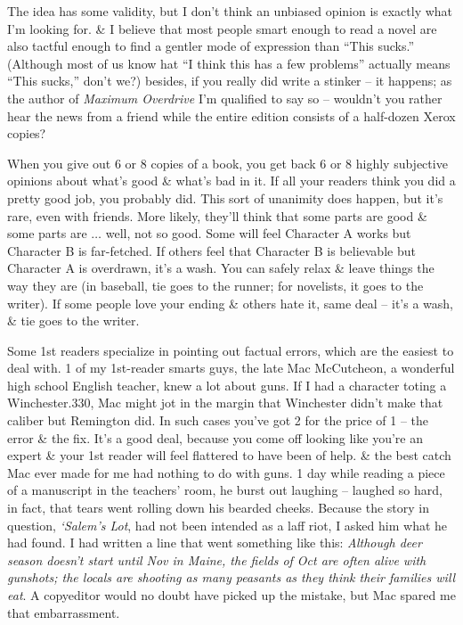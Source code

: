 \documentclass{article}
\numberwithin{equation}{section}
\begin{document}
The idea has some validity, but I don't think an unbiased opinion is exactly what I'm looking for. \& I believe that most people smart enough to read a novel are also tactful enough to find a gentler mode of expression than ``This sucks.'' (Although most of us know hat ``I think this has a few problems'' actually means ``This sucks,'' don't we?) besides, if you really did write a stinker -- it happens; as the author of \textit{Maximum Overdrive} I'm qualified to say so -- wouldn't you rather hear the news from a friend while the entire edition consists of a half-dozen Xerox copies?

When you give out 6 or 8 copies of a book, you get back 6 or 8 highly subjective opinions about what's good \& what's bad in it. If all your readers think you did a pretty good job, you probably did. This sort of unanimity does happen, but it's rare, even with friends. More likely, they'll think that some parts are good \& some parts are $\ldots$ well, not so good. Some will feel Character A works but Character B is far-fetched. If others feel that Character B is believable but Character A is overdrawn, it's a wash. You can safely relax \& leave things the way they are (in baseball, tie goes to the runner; for novelists, it goes to the writer). If some people love your ending \& others hate it, same deal -- it's a wash, \& tie goes to the writer.

Some 1st readers specialize in pointing out factual errors, which are the easiest to deal with. 1 of my 1st-reader smarts guys, the late Mac McCutcheon, a wonderful high school English teacher, knew a lot about guns. If I had a character toting a Winchester.330, Mac might jot in the margin that Winchester didn't make that caliber but Remington did. In such cases you've got 2 for the price of 1 -- the error \& the fix. It's a good deal, because you come off looking like you're an expert \& your 1st reader will feel flattered to have been of help. \& the best catch Mac ever made for me had nothing to do with guns. 1 day while reading a piece of a manuscript in the teachers' room, he burst out laughing -- laughed so hard, in fact, that tears went rolling down his bearded cheeks. Because the story in question, \textit{`Salem's Lot}, had not been intended as a laff riot, I asked him what he had found. I had written a line that went something like this: \textit{Although deer season doesn't start until Nov in Maine, the fields of Oct are often alive with gunshots; the locals are shooting as many peasants as they think their families will eat}. A copyeditor would no doubt have picked up the mistake, but Mac spared me that embarrassment.
\end{document}

